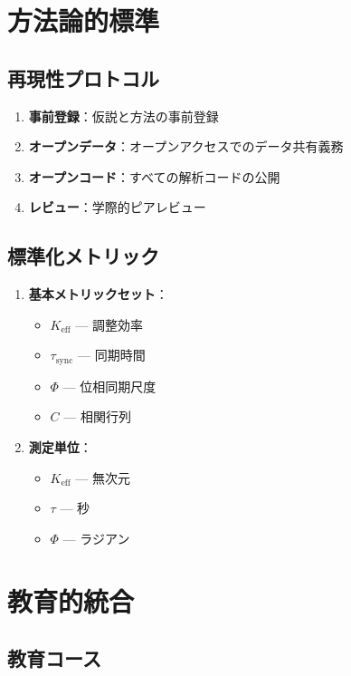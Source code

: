 \documentclass[12pt,a4paper]{article}
\begin{document}
	\section{方法論的標準}
	
	\subsection{再現性プロトコル}
	
	\begin{enumerate}
		\item \textbf{事前登録}：仮説と方法の事前登録
		\item \textbf{オープンデータ}：オープンアクセスでのデータ共有義務
		\item \textbf{オープンコード}：すべての解析コードの公開
		\item \textbf{レビュー}：学際的ピアレビュー
	\end{enumerate}
	
	\subsection{標準化メトリック}
	
	\begin{enumerate}
		\item \textbf{基本メトリックセット}：
		\begin{itemize}
			\item $K_{\mathrm{eff}}$ — 調整効率
			\item $\tau_{\mathrm{sync}}$ — 同期時間
			\item $\Phi$ — 位相同期尺度
			\item $C$ — 相関行列
		\end{itemize}
		
		\item \textbf{測定単位}：
		\begin{itemize}
			\item $K_{\mathrm{eff}}$ — 無次元
			\item $\tau$ — 秒
			\item $\Phi$ — ラジアン
		\end{itemize}
	\end{enumerate}
	
	\section{教育的統合}
	
	\subsection{教育コース}
	
\end{document}
